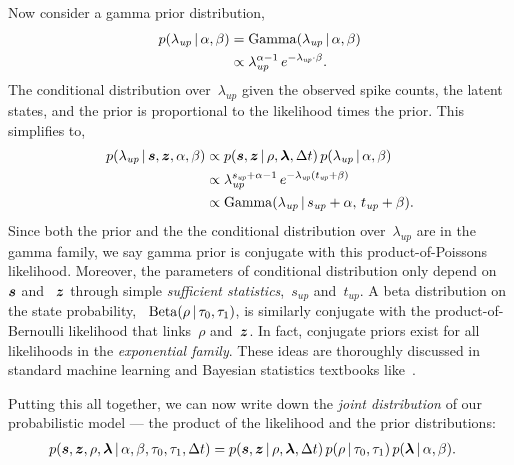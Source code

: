 Now consider a gamma prior distribution,
\begin{align}
  p(\lambda_{\textit{up}} \,|\, \alpha, \beta)
  &= \mathrm{Gamma}(\lambda_{\textit{up}} \,|\, \alpha, \beta) \\
  &\propto \lambda_{\textit{up}}^{\alpha - 1} \,
  e^{-\lambda_{\textit{up}} \cdot \beta}.
\end{align}
The conditional distribution over~$\lambda_{\textit{up}}$ given the
observed spike counts, the latent states, and the prior is
proportional to the likelihood times the prior. This simplifies to,
\begin{align}
  p(\lambda_{\textit{up}} \,|\, \boldsymbol{s}, \boldsymbol{z}, \alpha, \beta)
  &\propto p(\boldsymbol{s}, \boldsymbol{z} \,|\, \rho, \boldsymbol{\lambda}, \Delta t) \,
  p(\lambda_{\textit{up}} \,|\, \alpha, \beta) \\
  &\propto \lambda_{\textit{up}}^{s_{\textit{up}} + \alpha - 1} \,
  e^{-\lambda_{\textit{up}} (t_{\textit{up}} +\beta)} \\
  &\propto \mathrm{Gamma}(\lambda_{\textit{up}} \,|\,
  s_{\textit{up}} + \alpha, \,
  t_{\textit{up}} + \beta).
\end{align}
Since both the prior and the the conditional distribution
over~$\lambda_{\textit{up}}$ are in the gamma family, we say gamma
prior is conjugate with this product-of-Poissons likelihood.
Moreover, the parameters of
conditional distribution only depend on~$\boldsymbol{s}$ and ~$\boldsymbol{z}$ through
simple \emph{sufficient statistics},~$s_{\textit{up}}$
and~$t_{\textit{up}}$. A beta distribution on the state probability,
~${\mathrm{Beta}(\rho \,|\, \tau_0, \tau_1)}$, is similarly conjugate
with the product-of-Bernoulli likelihood that links~$\rho$ and~$\boldsymbol{z}$.
In fact,
conjugate priors exist for all likelihoods in the \emph{exponential
  family}. These ideas are thoroughly discussed in standard machine
learning and Bayesian statistics textbooks like~\citet{Murphy-2012}.

Putting this all together, we can now write down the \emph{joint
  distribution} of our probabilistic model --- the
product of the likelihood and the prior distributions:
\begin{align}
  \label{eq:full_joint}
  p(\boldsymbol{s}, \boldsymbol{z}, \rho, \boldsymbol{\lambda} \,|\, \alpha, \beta, \tau_0, \tau_1, \Delta t) 
  &= p(\boldsymbol{s}, \boldsymbol{z} \,|\, \rho, \boldsymbol{\lambda}, \Delta t) \,
  p(\rho \,|\, \tau_0, \tau_1) \, 
     p(\boldsymbol{\lambda} \,|\, \alpha, \beta).
\end{align}


